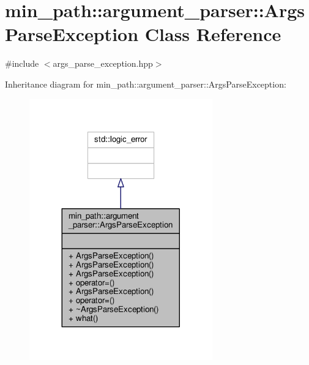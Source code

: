 \hypertarget{a00001}{}\section{min\+\_\+path\+:\+:argument\+\_\+parser\+:\+:Args\+Parse\+Exception Class Reference}
\label{a00001}


{\ttfamily \#include $<$args\+\_\+parse\+\_\+exception.\+hpp$>$}



Inheritance diagram for min\+\_\+path\+:\+:argument\+\_\+parser\+:\+:Args\+Parse\+Exception\+:
\nopagebreak
\begin{figure}[H]
\begin{center}
\leavevmode
\includegraphics[width=224pt]{de/de1/a00065}
\end{center}
\end{figure}


